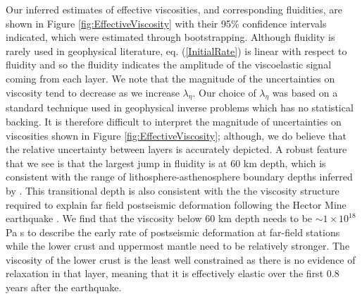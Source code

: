 \documentclass[1p]{elsarticle}
\begin{document}
Our inferred estimates of effective viscosities, and corresponding fluidities, are shown in Figure \ref{fig:EffectiveViscosity} with their 95\% confidence intervals indicated, which were estimated through bootstrapping. Although fluidity is rarely used in geophysical literature, eq. (\ref{InitialRate}) is linear with respect to fluidity and so the fluidity indicates the amplitude of the viscoelastic signal coming from each layer.  We note that the magnitude of the uncertainties on viscosity tend to decrease as we increase $\lambda_\eta$. Our choice of $\lambda_\eta$ was based on a standard technique used in geophysical inverse problems which has no statistical backing.  It is therefore difficult to interpret the magnitude of uncertainties on viscosities shown in Figure \ref{fig:EffectiveViscosity}; although, we do believe that the relative uncertainty between layers is accurately depicted. A robust feature that we see is that the largest jump in fluidity is at 60 km depth, which is consistent with the range of lithosphere-asthenosphere boundary depths inferred by \citet{Lekic2011}. This transitional depth is also consistent with the the viscosity structure required to explain far field postseismic deformation following the Hector Mine earthquake \citep{Freed2007a}. We find that the viscosity below 60 km depth needs to be $\sim1\times10^{18}$ Pa s to describe the early rate of postseismic deformation at far-field stations while the lower crust and uppermost mantle need to be relatively stronger.  The viscosity of the lower crust is the least well constrained as there is no evidence of relaxation in that layer, meaning that it is effectively elastic over the first 0.8 years after the earthquake.  
\end{document}
